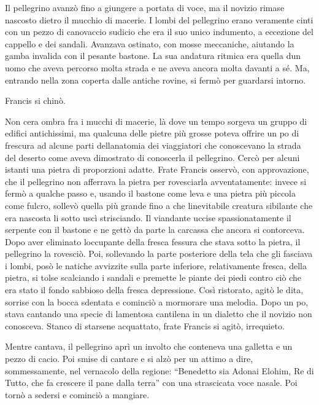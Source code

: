 Il pellegrino avanzò fino a giungere a portata di voce, ma il novizio
rimase nascosto dietro il mucchio di macerie. I lombi del pellegrino
erano veramente cinti con un pezzo di canovaccio sudicio che era il suo
unico indumento, a eccezione del cappello e dei sandali. Avanzava
ostinato, con mosse meccaniche, aiutando la gamba invalida con il
pesante bastone. La sua andatura ritmica era quella d\textquotesingle un
uomo che aveva percorso molta strada e ne aveva ancora molta davanti a
sé. Ma, entrando nella zona coperta dalle antiche rovine, si fermò per
guardarsi intorno.

Francis si chinò.

Non c\textquotesingle era ombra fra i mucchi di macerie, là dove un
tempo sorgeva un gruppo di edifici antichissimi, ma qualcuna delle
pietre più grosse poteva offrire un po\textquotesingle{} di frescura ad
alcune parti dell\textquotesingle anatomia dei viaggiatori che
conoscevano la strada del deserto come aveva dimostrato di conoscerla il
pellegrino. Cercò per alcuni istanti una pietra di proporzioni adatte.
Frate Francis osservò, con approvazione, che il pellegrino non afferrava
la pietra per rovesciarla avventatamente: invece si fermò a qualche
passo e, usando il bastone come leva e una pietra più piccola come
fulcro, sollevò quella più grande fino a che
l\textquotesingle inevitabile creatura sibilante che era nascosta li
sotto uscì strisciando. Il viandante uccise spassionatamente il serpente
con il bastone e ne gettò da parte la carcassa che ancora si contorceva.
Dopo aver eliminato l\textquotesingle occupante della fresca fessura che
stava sotto la pietra, il pellegrino la rovesciò. Poi, sollevando la
parte posteriore della tela che gli fasciava i lombi, posò le natiche
avvizzite sulla parte inferiore, relativamente fresca, della pietra, si
tolse scalciando i sandali e premette le piante dei piedi contro ciò che
era stato il fondo sabbioso della fresca depressione. Così ristorato,
agitò le dita, sorrise con la bocca sdentata e cominciò a mormorare una
melodia. Dopo un po\textquotesingle, stava cantando una specie di
lamentosa cantilena in un dialetto che il novizio non conosceva. Stanco
di starsene acquattato, frate Francis si agitò, irrequieto.

Mentre cantava, il pellegrino aprì un involto che conteneva una galletta
e un pezzo di cacio. Poi smise di cantare e si alzò per un attimo a
dire, sommessamente, nel vernacolo della regione: ``Benedetto sia Adonai
Elohim, Re di Tutto, che fa crescere il pane dalla terra'' con una
strascicata voce nasale. Poi tornò a sedersi e cominciò a mangiare.

